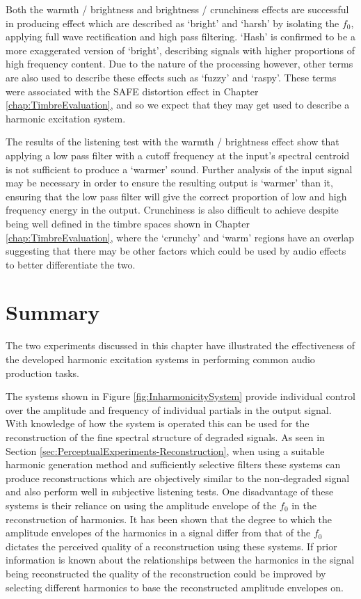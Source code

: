 		Both the warmth / brightness and brightness / crunchiness effects are successful in producing effect which
		are described as `bright' and `harsh' by isolating the $f_{0}$, applying full wave rectification and high
		pass filtering. `Hash' is confirmed to be a more exaggerated version of `bright', describing signals with
		higher proportions of high frequency content. Due to the nature of the processing however, other terms are
		also used to describe these effects such as `fuzzy' and `raspy'. These terms were associated with the SAFE
		distortion effect in Chapter \ref{chap:TimbreEvaluation}, and so we expect that they may get used to
		describe a harmonic excitation system.

		The results of the listening test with the warmth / brightness effect show that applying a low pass filter
		with a cutoff frequency at the input's spectral centroid is not sufficient to produce a `warmer' sound.
		Further analysis of the input signal may be necessary in order to ensure the resulting output is `warmer'
		than it, ensuring that the low pass filter will give the correct proportion of low and high frequency
		energy in the output. Crunchiness is also difficult to achieve despite being well defined in the timbre
		spaces shown in Chapter \ref{chap:TimbreEvaluation}, where the `crunchy' and `warm' regions have an overlap
		suggesting that there may be other factors which could be used by audio effects to better differentiate the
		two.

\section{Summary}
\label{sec:PerceptualExperiments-Summary}
	The two experiments discussed in this chapter have illustrated the effectiveness of the developed harmonic
	excitation systems in performing common audio production tasks. 
	
	The systems shown in Figure \ref{fig:InharmonicitySystem} provide individual control over the amplitude and
	frequency of individual partials in the output signal. With knowledge of how the system is operated this can be
	used for the reconstruction of the fine spectral structure of degraded signals. As seen in Section
	\ref{sec:PerceptualExperiments-Reconstruction}, when using a suitable harmonic generation method and sufficiently
	selective filters these systems can produce reconstructions which are objectively similar to the non-degraded
	signal and also perform well in subjective listening tests. One disadvantage of these systems is their reliance on
	using the amplitude envelope of the $f_{0}$ in the reconstruction of harmonics. It has been shown that the degree
	to which the amplitude envelopes of the harmonics in a signal differ from that of the $f_{0}$ dictates the
	perceived quality of a reconstruction using these systems. If prior information is known about the relationships
	between the harmonics in the signal being reconstructed the quality of the reconstruction could be improved by
	selecting different harmonics to base the reconstructed amplitude envelopes on.

